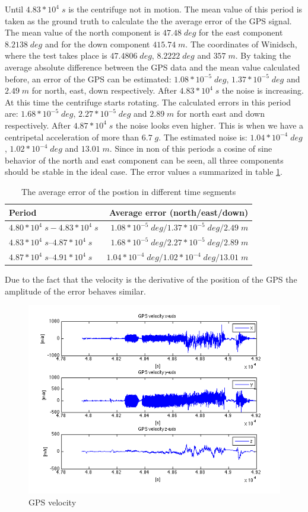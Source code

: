 Until $4.83*10^{4}\; s$ is the centrifuge not in motion. The mean value of this period is taken as the ground truth to calculate the the average error of the GPS signal. The mean value of the north component is $47.48\;deg$ for the east component $8.2138\;deg$ and for the down component $415.74\;m$. The coordinates of Winidsch, where the test takes place is $47.4806\;deg$, $8.2222\;deg$ and $357\;m$. By taking the average absolute difference between the GPS data and the mean value calculated before, an error of the GPS can be estimated: $1.08*10^{-5}\;deg$, $1.37*10^{-5}\;deg$ and $2.49\;m$ for north, east, down respectively. After $4.83*10^{4}\;s$ the noise is increasing. At this time the centrifuge starts rotating. The calculated  errors in this period are: $1.68*10^{-5}\;deg$, $2.27*10^{-5}\;deg$ and $2.89\;m$ for north east and down respectively. After $4.87*10^{4}\;s$ the noise looks even higher. This is when we have  a centripetal acceleration of more than  $6.7\;g$. The estimated noise is: $1.04*10^{-4}\;deg$, $1.02*10^{-4}\;deg$ and $13.01\;m$. Since in non of this periods a cosine of sine behavior of the north and east component can be seen, all three components should be stable in the ideal case. The error values a summarized in table \ref{ct_pos_error}.
\begin{table}[h]
\centering
\begin{tabular}{|l|r|}
\hline
Period & Average error (north/east/down) \\
\hline
$4.80*10^{4}\;s - 4.83*10^{4}\;s$&$1.08*10^{-5}\;deg / 1.37*10^{-5}\;deg / 2.49\;m$\\
\hline
$4.83*10^{4}\;s – 4.87*10^{4}\;s$&$1.68*10^{-5}\;deg / 2.27*10^{-5}\;deg / 2.89\;m$\\
\hline
$4.87*10^{4}\;s – 4.91*10^{4}\;s$&$1.04*10^{-4}\;deg/ 1.02*10^{-4}\;deg / 13.01\;m$\\
\hline
\end{tabular}
\caption{The average error of the postion in different time segments}
\label{ct_pos_error}
\end{table}
Due to the fact that the velocity is the derivative of the position of the GPS the amplitude of the error behaves  similar.
\begin{figure}[hb]
\centering
\includegraphics[width=1\textwidth]{pictures/ct_vel.png}
\caption{GPS velocity}
\label{ct_vel}
\end{figure}
